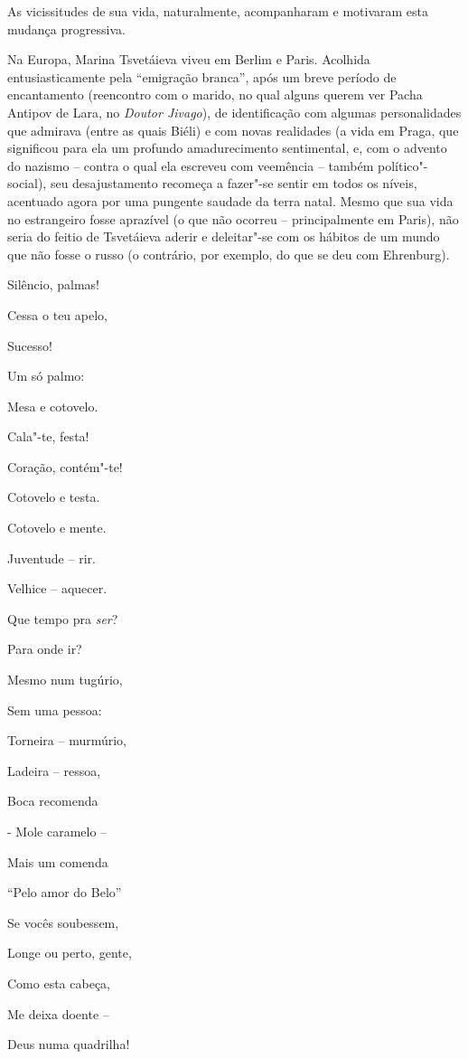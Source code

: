 As vicissitudes de sua vida, naturalmente, acompanharam e motivaram esta
mudança progressiva.

Na Europa, Marina Tsvetáieva viveu em Berlim e Paris. Acolhida
entusiasticamente pela ``emigração branca'', após um breve período de
encantamento (reencontro com o marido, no qual alguns querem ver Pacha
Antipov de Lara, no \emph{Doutor Jivago}), de identificação com algumas
personalidades que admirava (entre as quais Biéli) e com novas
realidades (a vida em Praga, que significou para ela um profundo
amadurecimento sentimental, e, com o advento do nazismo -- contra o qual
ela escreveu com veemência -- também político"-social), seu
desajustamento recomeça a fazer"-se sentir em todos os níveis, acentuado
agora por uma pungente saudade da terra natal. Mesmo que sua vida no
estrangeiro fosse aprazível (o que não ocorreu -- principalmente em
Paris), não seria do feitio de Tsvetáieva aderir e deleitar"-se com os
hábitos de um mundo que não fosse o russo (o contrário, por exemplo, do
que se deu com Ehrenburg).

Silêncio, palmas!

Cessa o teu apelo,

Sucesso!

Um só palmo:

Mesa e cotovelo.

Cala"-te, festa!

Coração, contém"-te!

Cotovelo e testa.

Cotovelo e mente.

Juventude -- rir.

Velhice -- aquecer.

Que tempo pra \emph{ser}?

Para onde ir?

Mesmo num tugúrio,

Sem uma pessoa:

Torneira -- murmúrio,

Ladeira -- ressoa,

Boca recomenda

- Mole caramelo --

Mais um comenda

``Pelo amor do Belo''

Se vocês soubessem,

Longe ou perto, gente,

Como esta cabeça,

Me deixa doente --

Deus numa quadrilha!

